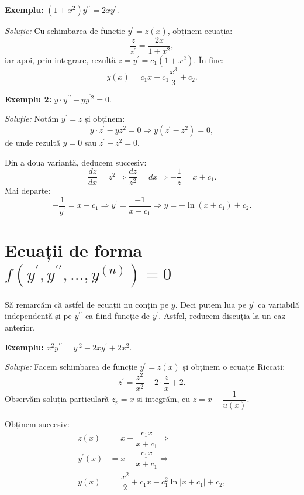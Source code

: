\textbf{Exemplu:} $ (1 + x^2)y^{\prime\prime} = 2xy^{\prime} $.

\emph{Soluție:} Cu schimbarea de funcție $ y^{\prime} = z(x) $, obținem ecuația:
\[
  \dfrac{z}{z^{\prime}} = \dfrac{2x}{1 + x^2},
\]
iar apoi, prin integrare, rezultă $ z = y^{\prime} = c_1(1 + x^2) $. În fine:
\[
  y(x) = c_1 x + c_1 \dfrac{x^3}{3} + c_2.
\]
\vspace{1cm}

\textbf{Exemplu 2:} $ y \cdot y^{\prime\prime} - yy^{^{\prime}2} = 0 $.

\emph{Soluție:} Notăm $ y^{\prime} = z $ și obținem:
\[
  y\cdot z^{\prime} - yz^2 = 0 \Rightarrow y(z^{\prime} - z^2) = 0,
\]
de unde rezultă $ y = 0 $ sau $ z^{\prime} - z^2 = 0 $.

Din a doua variantă, deducem succesiv:
\[
  \dfrac{dz}{dx} = z^2 \Rightarrow \dfrac{dz}{z^2} = dx \Rightarrow %
  -\dfrac{1}{z} = x + c_1.
\]
Mai departe:
\[
  -\dfrac{1}{y^{\prime}} = x + c_1 \Rightarrow y^{\prime} = \dfrac{-1}{x + c_1} %
  \Rightarrow y = -\ln(x + c_1) + c_2.
\]



\section{Ecuații de forma $ f(y^{\prime}, y^{\prime\prime}, \dots, y^{(n)}) = 0 $}

Să remarcăm că astfel de ecuații nu conțin pe $ y $. Deci putem lua pe $ y^{\prime} $
ca variabilă independentă și pe $ y^{\prime\prime} $ ca fiind funcție de $ y^{\prime} $.
Astfel, reducem discuția la un caz anterior.

\textbf{Exemplu:} $ x^2 y^{\prime\prime} = y^{^{\prime}2} - 2xy^{\prime} + 2x^2 $.

\emph{Soluție:} Facem schimbarea de funcție $ y^{\prime} = z(x) $ și obținem o
ecuație Riccati:
\[
  z^{\prime} = \dfrac{z^2}{x^2} - 2 \cdot \dfrac{z}{x} + 2.
\]
Observăm soluția particulară $ z_p = x $ și integrăm, cu $ z = x + \dfrac{1}{u(x)} $.

Obținem succesiv:
\begin{align*}
  z(x) &= x + \dfrac{c_1x}{x + c_1} \Rightarrow \\
  y^{\prime}(x) &= x + \dfrac{c_1x}{x + c_1} \Rightarrow \\
  y(x) &= \dfrac{x^2}{2} + c_1 x - c_1^2 \ln | x + c_1 | + c_2,
\end{align*}

